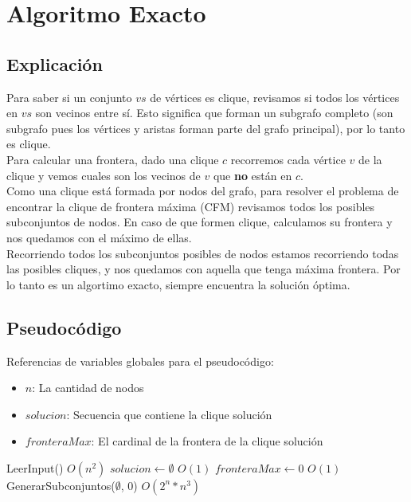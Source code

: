 
\section{Algoritmo Exacto}

\subsection{Explicación}
Para saber si un conjunto $vs$ de vértices es clique, revisamos si todos los vértices en $vs$ son vecinos entre sí.
Esto significa que forman un subgrafo completo (son subgrafo pues los vértices y aristas forman parte del grafo principal), por lo tanto es clique. \\

Para calcular una frontera, dado una clique $c$ recorremos cada vértice $v$ de la clique y vemos cuales son los vecinos de $v$ que \textbf{no} están en $c$. \\

Como una clique está formada por nodos del grafo, para resolver el problema de encontrar la clique de frontera máxima (CFM) revisamos todos los posibles subconjuntos de nodos. En caso de que formen clique, calculamos su frontera y nos quedamos con el máximo de ellas. \\

Recorriendo todos los subconjuntos posibles de nodos estamos recorriendo todas las posibles cliques, y nos quedamos con aquella que tenga máxima frontera. Por lo tanto es un algortimo exacto, siempre encuentra la solución óptima. \\

\subsection{Pseudocódigo}

Referencias de variables globales para el pseudocódigo:
\begin{itemize}
    \item $n$: La cantidad de nodos
    \item $solucion$: Secuencia que contiene la clique solución
    \item $fronteraMax$: El cardinal de la frontera de la clique solución
\end{itemize}

\begin{algorithm}[H]
\begin{algorithmic}
    \State LeerInput() \Comment $O(n^2)$
    \State $solucion \gets \emptyset$ \Comment $O(1)$
    \State $fronteraMax \gets 0$ \Comment $O(1)$
    \State GenerarSubconjuntos($\emptyset$, $0$) \Comment $O(2^{n} * n^{3})$
\EndFunction
\end{algorithmic}
\end{algorithm}

